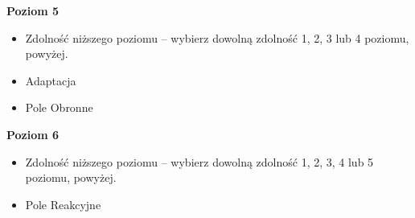 \textbf{Poziom 5}

\begin{itemize}
\item Zdolność niższego poziomu – wybierz dowolną zdolność 1, 2, 3 lub 4 poziomu, powyżej.
\item Adaptacja
\item Pole Obronne
\end{itemize}

\textbf{Poziom 6}

\begin{itemize}
\item Zdolność niższego poziomu – wybierz dowolną zdolność 1, 2, 3, 4 lub 5 poziomu, powyżej.
\item Pole Reakcyjne
 \end{itemize}

